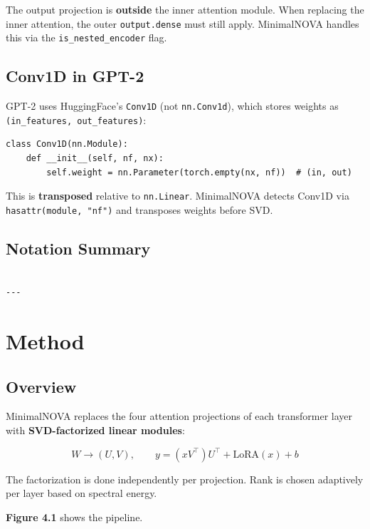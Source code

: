 The output projection is \textbf{outside} the inner attention module. When 
replacing the inner attention, the outer \texttt{output.dense} must still apply. 
MinimalNOVA handles this via the \texttt{is\_nested\_encoder} flag.

\subsection{Conv1D in GPT-2}

GPT-2 uses HuggingFace's \texttt{Conv1D} (not \texttt{nn.Conv1d}), which stores weights 
as \texttt{(in\_features, out\_features)}:

\begin{lstlisting}
class Conv1D(nn.Module):
    def __init__(self, nf, nx):
        self.weight = nn.Parameter(torch.empty(nx, nf))  # (in, out)
\end{lstlisting}

This is \textbf{transposed} relative to \texttt{nn.Linear}. MinimalNOVA detects Conv1D 
via \texttt{hasattr(module, "nf")} and transposes weights before SVD.

\subsection{Notation Summary}

\begin{lstlisting}

---
\end{lstlisting}


\section{Method}

\subsection{Overview}

MinimalNOVA replaces the four attention projections of each transformer layer 
with \textbf{SVD-factorized linear modules}:

\[
W \to (U, V), \qquad
y = (x V^\top) U^\top + \text{LoRA}(x) + b
\tag{4.1}
\]

The factorization is done independently per projection. Rank is chosen 
adaptively per layer based on spectral energy.

\textbf{Figure 4.1} shows the pipeline.

